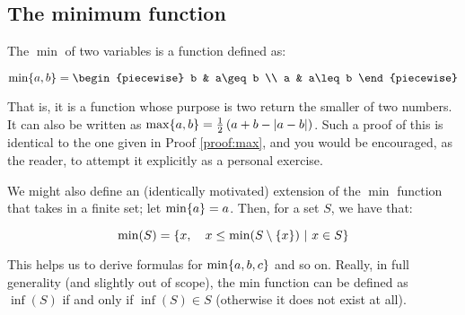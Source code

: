 \subsection{The minimum function}
\label{section:min}
The $\min$ of two variables is a function defined as:

$$
    \min\br{a,b}=\begin{piecewise}
        b & a\geq b \\
        a & a\leq b
    \end{piecewise}
$$

That is, it is a function whose purpose is two return the smaller of two numbers. It can also be written as $\max\{a,b\}=\frac{1}{2}\left(a+b-\abs{a-b}\right)$. Such a proof of this is identical to the one given in Proof \ref{proof:max}, and you would be encouraged, as the reader, to attempt it explicitly as a personal exercise.

We might also define an (identically motivated) extension of the $\min$ function that takes in a finite set; let $\min\{a\}=a$. Then, for a set $S$, we have that:

$$
    \min(S)=\left\{x,\quad x\leq\min(S\setminus\{x\})\ \middle|\ x\in S\right\}
$$

This helps us to derive formulas for $\min\{a,b,c\}$ and so on. Really, in full generality (and slightly out of scope), the min function can be defined as $\inf(S)$ if and only if $\inf(S)\in S$ (otherwise it does not exist at all).

